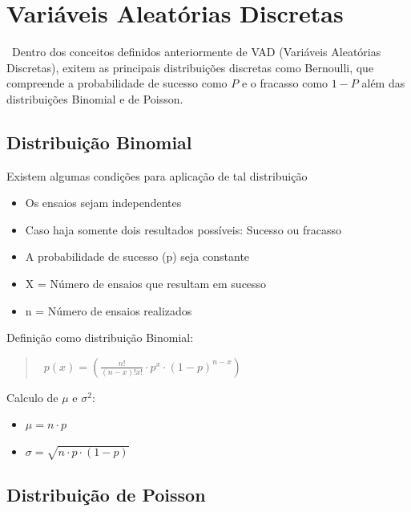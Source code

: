 \documentclass{article}
\begin{document}
    \newpage

\section{Variáveis Aleatórias Discretas}

  \ Dentro dos conceitos definidos anteriormente de VAD (Variáveis Aleatórias Discretas), exitem as principais distribuições discretas como Bernoulli, que 
  compreende a probabilidade de sucesso como $ P $ e o fracasso como $ 1-P $ além das distribuições Binomial e de Poisson.
  
  \subsection{Distribuição Binomial}

  \begin{multicols}{2}

  Existem algumas condições para aplicação de tal distribuição
  \begin{itemize}
    \item Os ensaios sejam independentes
    \item Caso haja somente dois resultados possíveis: Sucesso ou fracasso
    \item A probabilidade de sucesso (p) seja constante
    \item X = Número de ensaios que resultam em sucesso
    \item n = Número de ensaios realizados
  \end{itemize}

  Definição como distribuição Binomial:

  \begin{Large}
  \begin{quote}
    \hbox{
    $ p(x) = \left( \frac{n!}{(n-x)!x!} \cdot p^x \cdot (1-p)^{n-x} \right)$}
  \end{quote}
  \end{Large}
  
  Calculo de $ \mu $ e $ \sigma^2 $:
 
  \begin{itemize}
    \item $ \mu = n \cdot p $
    \item $ \sigma = \sqrt{n \cdot p \cdot (1 - p)} $
  \end{itemize}  
  \end{multicols}

  \subsection{Distribuição de Poisson}
\end{document}
